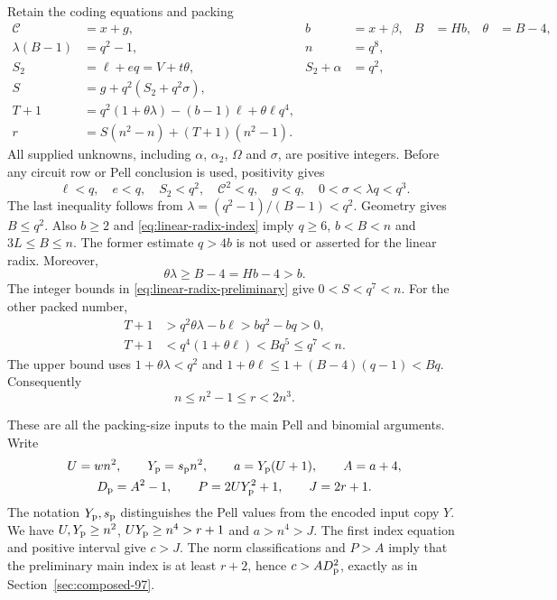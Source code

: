 Retain the coding equations and packing
\begin{equation}\label{eq:linear-radix-packing}
 \begin{aligned}
 \mathcal C&=x+g,& b&=x+\beta,& B&=Hb,&\theta&=B-4,\\
 \lambda(B-1)&=q^2-1,& n&=q^8,\\
 S_2&=\ell+eq=V+t\theta,&S_2+\alpha&=q^2,\\
 S&=g+q^2(S_2+q^2\sigma),\\
 T+1&=q^2(1+\theta\lambda)-(b-1)\ell+\theta\ell q^4,\\
 r&=S(n^2-n)+(T+1)(n^2-1).
 \end{aligned}
\end{equation}
All supplied unknowns, including $\alpha$, $\alpha_2$,
$\Omega$ and $\sigma$, are positive integers. Before any circuit
row or Pell conclusion is used, positivity gives
\begin{equation}\label{eq:linear-radix-preliminary}
 \ell<q,\quad e<q,\quad S_2<q^2,\quad
 \mathcal C^2<q,\quad g<q,\quad
 0<\sigma<\lambda q<q^3.
\end{equation}
The last inequality follows from
$\lambda=(q^2-1)/(B-1)<q^2$. Geometry gives $B\le q^2$.
Also $b\ge2$ and \eqref{eq:linear-radix-index} imply
$q\ge6$, $b<B<n$ and $3L\le B\le n$. The former estimate
$q>4b$ is not used or asserted for the linear radix. Moreover,
\[
 \theta\lambda\ge B-4=Hb-4>b.
\]
The integer bounds in \eqref{eq:linear-radix-preliminary} give
$0<S<q^7<n$. For the other packed number,
\begin{equation}\label{eq:linear-radix-packed-range}
 \begin{aligned}
 T+1&>q^2\theta\lambda-b\ell>bq^2-bq>0,\\
 T+1&<q^4(1+\theta\ell)<Bq^5\le q^7<n.
 \end{aligned}
\end{equation}
The upper bound uses $1+\theta\lambda<q^2$ and
$1+\theta\ell\le1+(B-4)(q-1)<Bq$. Consequently
\begin{equation}\label{eq:linear-radix-r-range}
 n\le n^2-1\le r<2n^3.
\end{equation}

These are all the packing-size inputs to the main Pell and
binomial arguments. Write
\[
 \begin{gathered}
 U=wn^2,\qquad Y_{\rm p}=s_{\rm p}n^2,
 \qquad a=Y_{\rm p}(U+1),\qquad A=a+4,\\
 D_{\rm p}=A^2-1,\qquad P=2UY_{\rm p}^2+1,
 \qquad J=2r+1.
 \end{gathered}
\]
The notation $Y_{\rm p},s_{\rm p}$ distinguishes the Pell values
from the encoded input copy $Y$. We have
$U,Y_{\rm p}\ge n^2$, $UY_{\rm p}\ge n^4>r+1$ and
$a>n^4>J$. The first index equation and positive interval give
$c>J$. The norm classifications and $P>A$ imply that the preliminary
main index is at least $r+2$, hence $c>AD_{\rm p}^2$, exactly as
in Section~\ref{sec:composed-97}.

